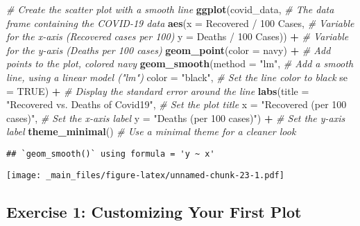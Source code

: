 \documentclass[
]{book}
\newenvironment{Shaded}{\begin{snugshade}}{\end{snugshade}}
\newcommand{\AttributeTok}[1]{\textcolor[rgb]{0.13,0.29,0.53}{#1}}
\newcommand{\CommentTok}[1]{\textcolor[rgb]{0.56,0.35,0.01}{\textit{#1}}}
\newcommand{\ConstantTok}[1]{\textcolor[rgb]{0.56,0.35,0.01}{#1}}
\newcommand{\FunctionTok}[1]{\textcolor[rgb]{0.13,0.29,0.53}{\textbf{#1}}}
\newcommand{\NormalTok}[1]{#1}
\newcommand{\SpecialCharTok}[1]{\textcolor[rgb]{0.81,0.36,0.00}{\textbf{#1}}}
\newcommand{\StringTok}[1]{\textcolor[rgb]{0.31,0.60,0.02}{#1}}
\begin{document}
\begin{Shaded}
\begin{Highlighting}[]
\CommentTok{\# Create the scatter plot with a smooth line}
\FunctionTok{ggplot}\NormalTok{(covid\_data, }\CommentTok{\# The data frame containing the COVID{-}19 data}
       \FunctionTok{aes}\NormalTok{(}\AttributeTok{x =} \StringTok{\textasciigrave{}}\AttributeTok{Recovered / 100 Cases}\StringTok{\textasciigrave{}}\NormalTok{, }\CommentTok{\# Variable for the x{-}axis (Recovered cases per 100)}
           \AttributeTok{y =} \StringTok{\textasciigrave{}}\AttributeTok{Deaths / 100 Cases}\StringTok{\textasciigrave{}}\NormalTok{)) }\SpecialCharTok{+} \CommentTok{\# Variable for the y{-}axis (Deaths per 100 cases)}
  \FunctionTok{geom\_point}\NormalTok{(}\AttributeTok{color =} \StringTok{\textquotesingle{}navy\textquotesingle{}}\NormalTok{) }\SpecialCharTok{+} \CommentTok{\# Add points to the plot, colored navy}
  \FunctionTok{geom\_smooth}\NormalTok{(}\AttributeTok{method =} \StringTok{"lm"}\NormalTok{, }\CommentTok{\# Add a smooth line, using a linear model ("lm")}
              \AttributeTok{color =} \StringTok{"black"}\NormalTok{, }\CommentTok{\# Set the line color to black}
              \AttributeTok{se =} \ConstantTok{TRUE}\NormalTok{) }\SpecialCharTok{+} \CommentTok{\# Display the standard error around the line}
  \FunctionTok{labs}\NormalTok{(}\AttributeTok{title =} \StringTok{"Recovered vs. Deaths of Covid19"}\NormalTok{, }\CommentTok{\# Set the plot title}
       \AttributeTok{x =} \StringTok{"Recovered (per 100 cases)"}\NormalTok{, }\CommentTok{\# Set the x{-}axis label}
       \AttributeTok{y =} \StringTok{"Deaths (per 100 cases)"}\NormalTok{) }\SpecialCharTok{+} \CommentTok{\# Set the y{-}axis label}
  \FunctionTok{theme\_minimal}\NormalTok{() }\CommentTok{\# Use a minimal theme for a cleaner look}
\end{Highlighting}
\end{Shaded}

\begin{verbatim}
## `geom_smooth()` using formula = 'y ~ x'
\end{verbatim}

\texttt{[image: \_main\_files/figure-latex/unnamed-chunk-23-1.pdf]}

\subsection{Exercise 1: Customizing Your First Plot}\label{exercise-1-customizing-your-first-plot}
\end{document}
